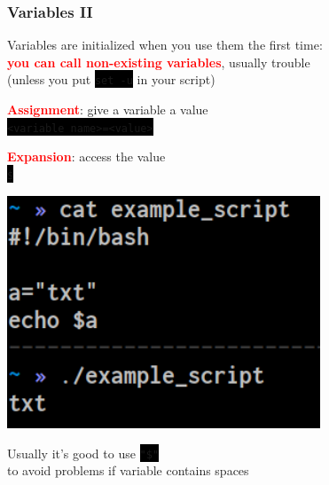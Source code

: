 \documentclass[unknownkeysallowed, 10pt, a4 paper, handout]{beamer}
\newcommand{\focus}[1]{\textbf{\textcolor{red}{#1}}}
\newcommand{\code}[1]{\colorbox{black}{\color{green}\texttt{#1}}}
\newcommand{\sidebyside}[5]{
  \begin{minipage}{#1\textwidth}
    #2
  \end{minipage} #3 \begin{minipage}{#4\textwidth}
    #5
  \end{minipage}
}
\begin{document}
\begin{frame}
  \begin{center}
    \frametitle{Variables II}

    Variables are initialized when you use them the first time:\\
    \focus{you can call non-existing variables}, usually trouble\\
    (unless you put \code{set -u} in your script)

    \vspace{5mm}

    \sidebyside{0.50}{
      \centering
      \focus{Assignment}: give a variable a value\\
      \code{<variable name>=<value>}

      \vspace{3mm}

      \focus{Expansion}: access the value\\
      \code{\$<variable name>}
    }{\hfill}{0.45}{
      \begin{center}
        \includegraphics[width=0.70\textwidth]{pics/variables_1.png}
      \end{center}
    }

    \vspace{5mm}

    Usually it's good to use \code{"\$<variable name>"}\\
    to avoid problems if variable contains spaces
  \end{center}
\end{frame}
\end{document}
